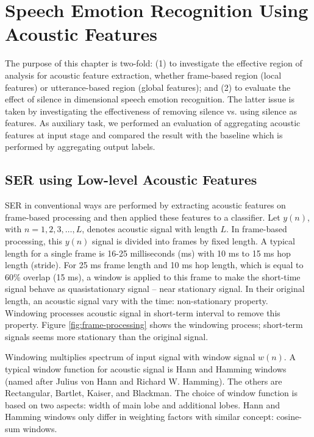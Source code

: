 \chapter{Speech Emotion Recognition Using Acoustic Features}
The purpose of this chapter is two-fold: (1) to investigate the effective 
region of analysis for acoustic feature extraction, whether frame-based region
(local features) or utterance-based region (global features); and (2) to
evaluate the
effect of silence in dimensional speech emotion recognition. The latter issue
is taken by investigating the effectiveness of removing silence vs. using
silence as features. As auxiliary task, we performed an evaluation of
aggregating acoustic features at input stage and compared the result with the
baseline which is performed by aggregating output labels.

\section{SER using Low-level Acoustic Features}
SER in conventional ways are performed by extracting acoustic features on
frame-based processing and then applied these features to a classifier. Let
$y(n)$, with $ n = 1, 2, 3, \ldots , L$, denotes acoustic signal with length
$L$.  In frame-based processing, this $y(n)$ signal is divided into frames by
fixed length. A typical length for a single frame is 16-25 milliseconds (ms)
with 10 ms to 15 ms hop length (stride). For 25 ms frame length and 10 ms hop
length, which is equal to 60\% overlap (15 ms), a window is applied to this
frame to make the short-time signal behave as quasistationary signal -- near
stationary signal. In their original length, an acoustic signal vary with the
time: non-stationary property.  Windowing processes acoustic signal in
short-term interval to remove this property. Figure \ref{fig:frame-processing}
shows the windowing process; short-term signals seems more stationary than the
original signal.


Windowing multiplies spectrum of input signal with window signal $w(n)$.  A
typical window function for acoustic signal is Hann and Hamming windows (named
after Julius von Hann and Richard W. Hamming).  The others are Rectangular,
Bartlet, Kaiser, and Blackman.  The choice of window function is based
on two aspects: width of main lobe and additional lobes. Hann and Hamming
windows only differ in weighting factors with similar concept: cosine-sum
windows. 

